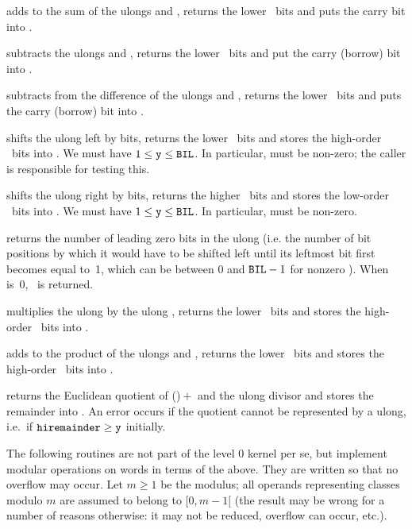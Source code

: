  adds  to the sum of the
ulongs  and , returns the lower \B\ bits and puts the
carry bit into .

 subtracts the ulongs  and ,
returns the lower \B\ bits and put the carry (borrow) bit into .

 subtracts  from the
difference of the ulongs  and , returns the lower \B\ bits
and puts the carry (borrow) bit into .

 shifts the ulong  left by 
bits, returns the lower \B\ bits and stores the high-order \B\ bits into
. We must have $1\le{\tt y}\le{\tt BIL}$. In particular, 
must be non-zero; the caller is responsible for testing this.

 shifts the ulong  right
by  bits, returns the higher \B\ bits and stores the low-order
\B\ bits into . We must have $1\le{\tt y}\le{\tt BIL}$. In
particular,  must be non-zero.

 returns the number of leading zero bits in the
ulong  (i.e. the number of bit positions by which it would have to be
shifted left until its leftmost bit first becomes equal to~1, which can be
between 0 and ${\tt BIL}-1$ for nonzero ). When  is~0, \B\ is returned.

 multiplies the ulong  by the ulong
, returns the lower \B\ bits and stores the high-order \B\ bits into
.

 adds  to the product
of the ulongs  and , returns the lower \B\ bits and stores the
high-order \B\ bits into .

 returns the Euclidean quotient of
()${}+{}$ and the ulong divisor  and
stores the remainder into . An error occurs if the quotient
cannot be represented by a ulong, i.e.~if ${\tt hiremainder}\ge{\tt y}$
initially.


The following routines are not part of the level 0 kernel per se, but
implement modular operations on words in terms of the above. They are written
so that no overflow may occur. Let $m \geq 1$ be the modulus; all operands
representing classes modulo $m$ are assumed to belong to $[0,m-1[$ (the
result may be wrong for a number of reasons otherwise: it may not be reduced,
overflow can occur, etc.).

